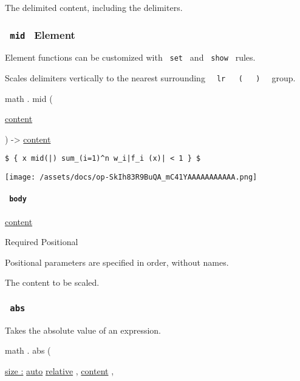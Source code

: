 The delimited content, including the delimiters.

\subsubsection{\texorpdfstring{\texttt{\ mid\ } {{ Element
}}}{ mid   Element }}\label{functions-mid}

\label{functions-mid-element-tooltip}
Element functions can be customized with \texttt{\ set\ } and
\texttt{\ show\ } rules.

Scales delimiters vertically to the nearest surrounding
\texttt{\ }{\texttt{\ lr\ }}\texttt{\ }{\texttt{\ (\ }}\texttt{\ }{\texttt{\ )\ }}\texttt{\ }
group.

math { . } { mid } (

{ \href{/docs/reference/foundations/content/}{content} }

) -\textgreater{} \href{/docs/reference/foundations/content/}{content}

\begin{verbatim}
$ { x mid(|) sum_(i=1)^n w_i|f_i (x)| < 1 } $
\end{verbatim}

\texttt{[image: /assets/docs/op-SkIh83R9BuQA\_mC41YAAAAAAAAAAA.png]}

\paragraph{\texorpdfstring{\texttt{\ body\ }}{ body }}\label{functions-mid-body}

\href{/docs/reference/foundations/content/}{content}

{Required} {{ Positional }}

\label{functions-mid-body-positional-tooltip}
Positional parameters are specified in order, without names.

The content to be scaled.

\subsubsection{\texorpdfstring{\texttt{\ abs\ }}{ abs }}\label{functions-abs}

Takes the absolute value of an expression.

math { . } { abs } (

{ \hyperref[functions-abs-parameters-size]{size :}
\href{/docs/reference/foundations/auto/}{auto}
\href{/docs/reference/layout/relative/}{relative} , } {
\href{/docs/reference/foundations/content/}{content} , }

